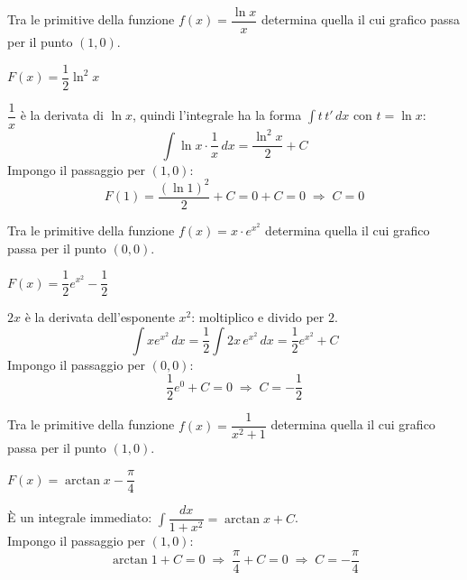 
\begin{question}[ID=2.2, subtitle={Primitiva di $f(x)=\ln(x)/x$ passante per $(1,0)$}, tags={integrali, primitiva}, difficulty=media]
Tra le primitive della funzione $f(x) = \dfrac{\ln x}{x}$ determina quella il cui grafico passa per il punto $(1,0)$.
\begin{solution}
$F(x)=\dfrac12\ln^2x$
\end{solution}
\begin{explanation}
$\dfrac1x$ è la derivata di $\ln x$, quindi l'integrale ha la forma $\int t\,t'\,dx$ con $t=\ln x$:
\[ \int\ln x\cdot\dfrac1x\,dx=\dfrac{\ln^2x}{2}+C \]
Impongo il passaggio per $(1,0)$:
\[ F(1)=\dfrac{(\ln1)^2}{2}+C=0+C=0 \;\Rightarrow\; C=0 \]
\end{explanation}
\end{question}


\begin{question}[ID=2.3, subtitle={Primitiva di $f(x)=xe^{x^2}$ passante per $(0,0)$}, tags={integrali, primitiva}, difficulty=media]
Tra le primitive della funzione $f(x) = x \cdot e^{x^2}$ determina quella il cui grafico passa per il punto $(0,0)$.
\begin{solution}
$F(x)=\dfrac12e^{x^2}-\dfrac12$
\end{solution}
\begin{explanation}
$2x$ è la derivata dell'esponente $x^2$: moltiplico e divido per $2$.
\[ \int xe^{x^2}\,dx=\dfrac12\int2x\,e^{x^2}\,dx=\dfrac12e^{x^2}+C \]
Impongo il passaggio per $(0,0)$:
\[ \dfrac12e^0+C=0 \;\Rightarrow\; C=-\dfrac12 \]
\end{explanation}
\end{question}


\begin{question}[ID=2.4, subtitle={Primitiva di $f(x)=1/(x^2+1)$ passante per $(1,0)$}, tags={integrali, primitiva}, difficulty=media]
Tra le primitive della funzione $f(x) = \dfrac{1}{x^2 + 1}$ determina quella il cui grafico passa per il punto $(1,0)$.
\begin{solution}
$F(x)=\arctan x-\dfrac\pi4$
\end{solution}
\begin{explanation}
È un integrale immediato: $\int\dfrac{dx}{1+x^2}=\arctan x+C$. \\
Impongo il passaggio per $(1,0)$:
\[ \arctan1+C=0 \;\Rightarrow\; \dfrac\pi4+C=0 \;\Rightarrow\; C=-\dfrac\pi4 \]
\end{explanation}
\end{question}

